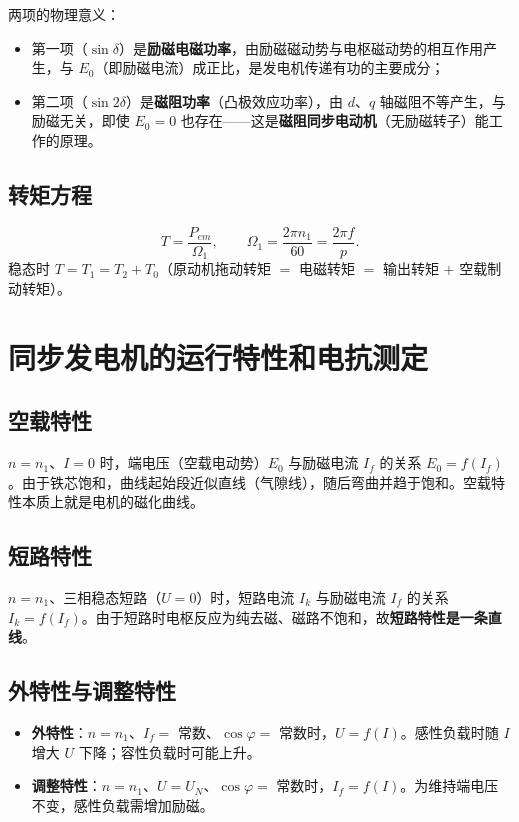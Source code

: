 
两项的物理意义：
\begin{itemize}
  \item 第一项（$\sin\delta$）是\textbf{励磁电磁功率}，由励磁磁动势与电枢磁动势的相互作用产生，与 $E_0$（即励磁电流）成正比，是发电机传递有功的主要成分；
  \item 第二项（$\sin2\delta$）是\textbf{磁阻功率}（凸极效应功率），由 $d$、$q$ 轴磁阻不等产生，与励磁无关，即使 $E_0=0$ 也存在——这是\textbf{磁阻同步电动机}（无励磁转子）能工作的原理。
\end{itemize}

\subsection{转矩方程}
\begin{equation}
T=\frac{P_{em}}{\Omega_1},\qquad \Omega_1=\frac{2\pi n_1}{60}=\frac{2\pi f}{p}.
\end{equation}
稳态时 $T=T_1=T_2+T_0$（原动机拖动转矩 $=$ 电磁转矩 $=$ 输出转矩 $+$ 空载制动转矩）。

\section{同步发电机的运行特性和电抗测定}

\subsection{空载特性}
$n=n_1$、$I=0$ 时，端电压（空载电动势）$E_0$ 与励磁电流 $I_f$ 的关系 $E_0=f(I_f)$。由于铁芯饱和，曲线起始段近似直线（气隙线），随后弯曲并趋于饱和。空载特性本质上就是电机的磁化曲线。

\subsection{短路特性}
$n=n_1$、三相稳态短路（$U=0$）时，短路电流 $I_k$ 与励磁电流 $I_f$ 的关系 $I_k=f(I_f)$。由于短路时电枢反应为纯去磁、磁路不饱和，故\textbf{短路特性是一条直线}。

\subsection{外特性与调整特性}
\begin{itemize}
  \item \textbf{外特性}：$n=n_1$、$I_f=$ 常数、$\cos\varphi=$ 常数时，$U=f(I)$。感性负载时随 $I$ 增大 $U$ 下降；容性负载时可能上升。
  \item \textbf{调整特性}：$n=n_1$、$U=U_N$、$\cos\varphi=$ 常数时，$I_f=f(I)$。为维持端电压不变，感性负载需增加励磁。
\end{itemize}

